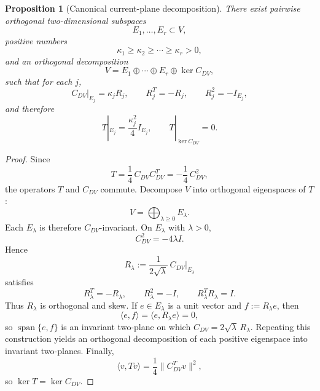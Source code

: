 \documentclass[11pt,a4paper]{article}
\numberwithin{equation}{section}
\theoremstyle{thmcompact}
\newtheorem{proposition}[theorem]{Proposition}
\theoremstyle{remark}
\begin{document}
\begin{proposition}[Canonical current-plane decomposition]
\label{prop:canonical_current_plane_decomposition}
There exist pairwise orthogonal two-dimensional subspaces
\begin{equation}
E_1,\dots,E_r\subset V,
\end{equation}
positive numbers
\begin{equation}
\kappa_1\ge \kappa_2\ge \cdots \ge \kappa_r>0,
\end{equation}
and an orthogonal decomposition
\begin{equation}
V=E_1\oplus\cdots\oplus E_r\oplus \ker C_{DV},
\end{equation}
such that for each \(j\),
\begin{equation}
C_{DV}|_{E_j}=\kappa_j R_j,
\qquad
R_j^T=-R_j,
\qquad
R_j^2=-I_{E_j},
\end{equation}
and therefore
\begin{equation}
T|_{E_j}=\frac{\kappa_j^2}{4}I_{E_j},
\qquad
T|_{\ker C_{DV}}=0.
\end{equation}
\end{proposition}

\begin{proof}
Since
\begin{equation}
T=\frac14\,C_{DV}C_{DV}^T=-\frac14\,C_{DV}^2,
\end{equation}
the operators \(T\) and \(C_{DV}\) commute. Decompose \(V\) into orthogonal eigenspaces of \(T\):
\begin{equation}
V=\bigoplus_{\lambda\ge 0} E_{\lambda}.
\end{equation}
Each \(E_{\lambda}\) is therefore \(C_{DV}\)-invariant. On \(E_{\lambda}\) with \(\lambda>0\),
\begin{equation}
C_{DV}^2=-4\lambda I.
\end{equation}
Hence
\begin{equation}
R_{\lambda}:=\frac{1}{2\sqrt{\lambda}}\,C_{DV}|_{E_{\lambda}}
\end{equation}
satisfies
\begin{equation}
R_{\lambda}^T=-R_{\lambda},
\qquad
R_{\lambda}^2=-I,
\qquad
R_{\lambda}^TR_{\lambda}=I.
\end{equation}
Thus \(R_{\lambda}\) is orthogonal and skew. If \(e\in E_{\lambda}\) is a unit vector and \(f:=R_{\lambda}e\), then
\begin{equation}
\langle e,f\rangle=\langle e,R_{\lambda}e\rangle=0,
\end{equation}
so \(\operatorname{span}\{e,f\}\) is an invariant two-plane on which \(C_{DV}=2\sqrt{\lambda}\,R_{\lambda}\). Repeating this construction yields an orthogonal decomposition of each positive eigenspace into invariant two-planes. Finally,
\begin{equation}
\langle v,Tv\rangle=\frac14\|C_{DV}^Tv\|^2,
\end{equation}
so \(\ker T=\ker C_{DV}\).
\end{proof}
\end{document}
